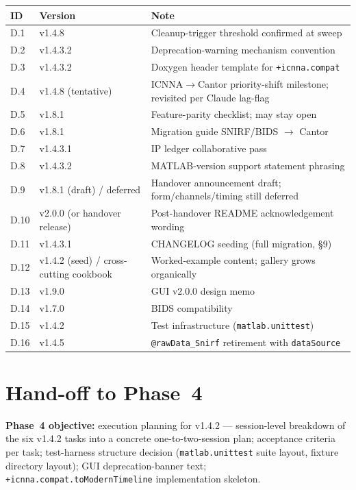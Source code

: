 \documentclass[11pt,a4paper]{article}
\begin{document}
\begin{table}[h]
\centering
\small
\begin{tabular}{llp{8cm}}
\toprule
\textbf{ID} & \textbf{Version} & \textbf{Note} \\
\midrule
D.1 & v1.4.8 & Cleanup-trigger threshold confirmed at sweep \\
D.2 & v1.4.3.2 & Deprecation-warning mechanism convention \\
D.3 & v1.4.3.2 & Doxygen header template for \texttt{+icnna.compat} \\
D.4 & v1.4.8 (tentative) & ICNNA$\to$Cantor priority-shift milestone; revisited per Claude lag-flag \\
D.5 & v1.8.1 & Feature-parity checklist; may stay open \\
D.6 & v1.8.1 & Migration guide SNIRF/BIDS $\to$ Cantor \\
D.7 & v1.4.3.1 & IP ledger collaborative pass \\
D.8 & v1.4.3.2 & MATLAB-version support statement phrasing \\
D.9 & v1.8.1 (draft) / deferred & Handover announcement draft; form/channels/timing still deferred \\
D.10 & v2.0.0 (or handover release) & Post-handover README acknowledgement wording \\
D.11 & v1.4.3.1 & CHANGELOG seeding (full migration, \S9) \\
D.12 & v1.4.2 (seed) / cross-cutting cookbook & Worked-example content; gallery grows organically \\
D.13 & v1.9.0 & GUI v2.0.0 design memo \\
D.14 & v1.7.0 & BIDS compatibility \\
D.15 & v1.4.2 & Test infrastructure (\texttt{matlab.unittest}) \\
D.16 & v1.4.5 & \texttt{@rawData\_Snirf} retirement with \texttt{dataSource} \\
\bottomrule
\end{tabular}
\end{table}

\section{Hand-off to Phase~4}

\textbf{Phase~4 objective:} execution planning for v1.4.2 --- session-level breakdown of the six v1.4.2 tasks into a concrete one-to-two-session plan; acceptance criteria per task; test-harness structure decision (\texttt{matlab.unittest} suite layout, fixture directory layout); GUI deprecation-banner text; \texttt{+icnna.compat.toModernTimeline} implementation skeleton.
\end{document}
